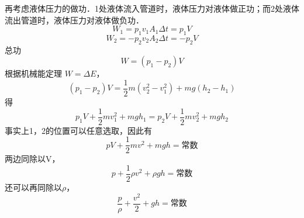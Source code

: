 再考虑液体压力的做功．1处液体流入管道时，液体压力对液体做正功；而2处液体流出管道时，液体压力对液体做负功．
\begin{equation}
W_1=p_1v_1A_1\Delta t=p_1V 
\end{equation}
\begin{equation}
W_2=-p_2v_2A_2 \Delta t=-p_2V 
\end{equation}
总功
\begin{equation}
W=(p_1-p_2)V
\end{equation}
根据机械能定理 $W=\Delta E$，
\begin{equation}
(p_1-p_2)V= \frac{1}{2}m(v_2^2-v_1^2)+mg(h_2-h_1)
\end{equation}
得
\begin{equation}
p_1V+\frac{1}{2}mv_1^2+mgh_1=p_2V+\frac{1}{2}mv_2^2+mgh_2
\end{equation}
事实上1，2的位置可以任意选取，因此有
\begin{equation}
pV+\frac{1}{2}mv^2+mgh=\text{常数}
\end{equation}
两边同除以V，
\begin{equation}
p+\frac{1}{2}\rho v^2+\rho gh=\text{常数}
\end{equation}
还可以再同除以$\rho$，
\begin{equation}
\frac{p}{\rho} + \frac{v^2}{2} + gh = \text{常数}
\end{equation}



